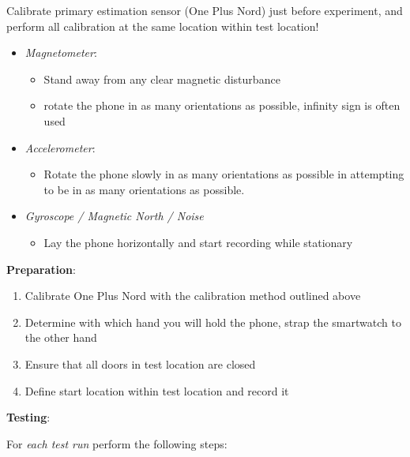Calibrate primary estimation sensor (One Plus Nord) just before
experiment, and perform all calibration at the same location within test
location!

\begin{itemize}
	\item
	\emph{Magnetometer}:
	
	\begin{itemize}
		\tightlist
		\item
		Stand away from any clear magnetic disturbance 
		\item
		rotate the phone in as many orientations as possible, infinity sign
		is often used
	\end{itemize}
	\item
	\emph{Accelerometer}:
	
	\begin{itemize}
		\tightlist
		\item
		Rotate the phone slowly in as many orientations as possible in
		attempting to be in as many orientations as possible.
	\end{itemize}
	\item
	\emph{Gyroscope / Magnetic North / Noise}
	
	\begin{itemize}
		\item
		Lay the phone horizontally and start recording while stationary
	\end{itemize}
\end{itemize}

\textbf{Preparation}:

\begin{enumerate}
	\def\labelenumi{\arabic{enumi}.}
	\tightlist
	\item
	Calibrate One Plus Nord with the calibration method outlined above
	\item
	Determine with which hand you will hold the phone, strap the
	smartwatch to the other hand
	\item
	Ensure that all doors in test location are closed
	\item
	Define start location within test location and record it
\end{enumerate}

\textbf{Testing}:

For \emph{each test run} perform the following steps:

